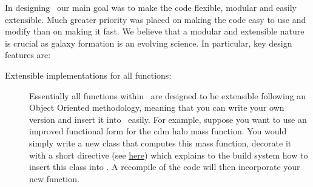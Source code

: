 In designing \glc\ our main goal was to make the code flexible, modular and easily extensible. Much greater priority was placed on making the code easy to use and modify than on making it fast. We believe that a modular and extensible nature is crucial as galaxy formation is an evolving science. In particular, key design features are:
\begin{description}
 \item [Extensible implementations for all functions:] Essentially all functions within \glc\ are designed to be extensible following an Object Oriented methodology, meaning that you can write your own version and insert it into \glc\ easily. For example, suppose you want to use an improved functional form for the \gls{cdm} halo mass function. You would simply write a new  class that computes this mass function, decorate it with a short directive (see \href{https://github.com/galacticusorg/galacticus/releases/download/bleeding-edge/Galacticus_Development.pdf#sec.CodeDirectives}{here}) which explains to the build system how to insert this class into \glc. A recompile of the code will then incorporate your new function.


\end{description}
